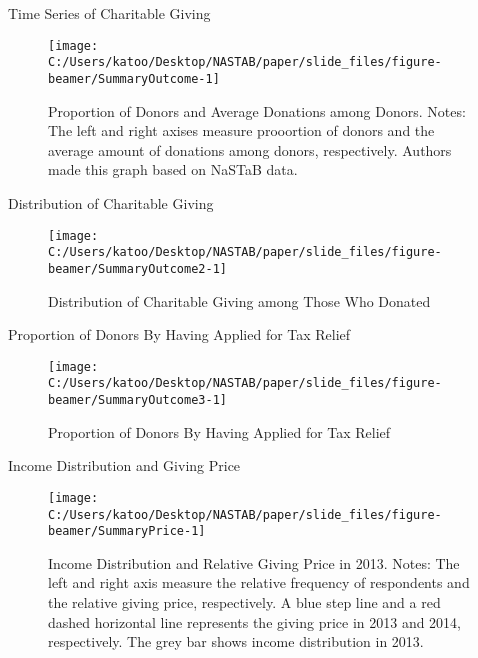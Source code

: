 \documentclass[
  ignorenonframetext,
  aspectratio=169,
]{beamer}
\begin{document}
\begin{frame}{Time Series of Charitable Giving}
\protect\hypertarget{time-series-of-charitable-giving}{}
\begin{figure}[t]

{\centering \texttt{[image: C:/Users/katoo/Desktop/NASTAB/paper/slide\_files/figure-beamer/SummaryOutcome-1]} 

}

\caption{Proportion of Donors and Average Donations among Donors. Notes: The left and right axises measure prooortion of donors and the average amount of donations among donors, respectively. Authors made this graph based on NaSTaB data.}\label{fig:SummaryOutcome}
\end{figure}
\end{frame}

\begin{frame}{Distribution of Charitable Giving}
\protect\hypertarget{distribution-of-charitable-giving}{}
\begin{figure}[t]

{\centering \texttt{[image: C:/Users/katoo/Desktop/NASTAB/paper/slide\_files/figure-beamer/SummaryOutcome2-1]} 

}

\caption{Distribution of Charitable Giving among Those Who Donated}\label{fig:SummaryOutcome2}
\end{figure}
\end{frame}

\begin{frame}{Proportion of Donors By Having Applied for Tax Relief}
\protect\hypertarget{proportion-of-donors-by-having-applied-for-tax-relief}{}
\begin{figure}[t]

{\centering \texttt{[image: C:/Users/katoo/Desktop/NASTAB/paper/slide\_files/figure-beamer/SummaryOutcome3-1]} 

}

\caption{Proportion of Donors By Having Applied for Tax Relief}\label{fig:SummaryOutcome3}
\end{figure}
\end{frame}

\begin{frame}{Income Distribution and Giving Price}
\protect\hypertarget{income-distribution-and-giving-price}{}
\begin{figure}[t]

{\centering \texttt{[image: C:/Users/katoo/Desktop/NASTAB/paper/slide\_files/figure-beamer/SummaryPrice-1]} 

}

\caption{Income Distribution and Relative Giving Price in 2013. Notes: The left and right axis measure the relative frequency of respondents and the relative giving price, respectively. A blue step line and a red dashed horizontal line represents the giving price in 2013 and 2014, respectively. The grey bar shows income distribution in 2013.}\label{fig:SummaryPrice}
\end{figure}
\end{frame}
\end{document}

